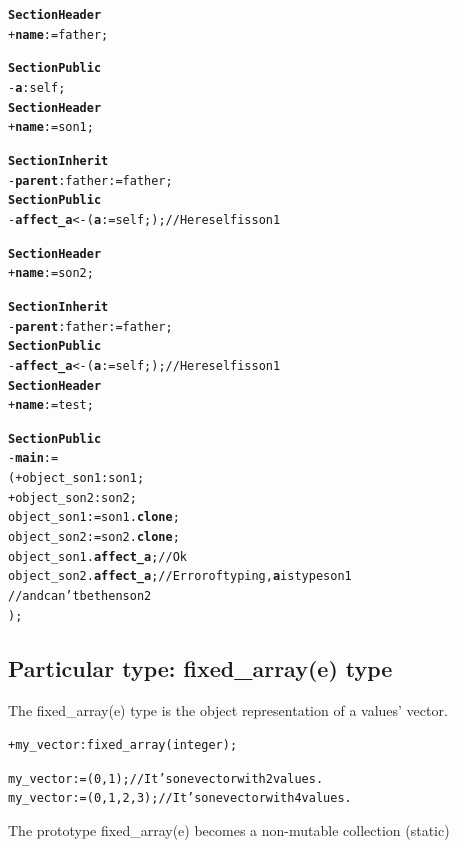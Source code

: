 \documentclass[11pt]{mybook}
\begin{document}
\begin{alltt}
{\bf{}Section Header}
  + {\bf{}name} := {\sc{}father};

{\bf{}Section Public}
  - {\bf{}a}:{\sc{}self};\\

{\bf{}Section Header}
  + {\bf{}name} := {\sc{}son1};

{\bf{}Section Inherit}
  - {\bf{}parent}:{\sc{}father} := {\sc{}father};
{\bf{}Section Public}
  - {\bf{}affect\_a} <- ( {\bf{}a} := {\sc{}self}; );  // Here {\sc{}self} is {\sc{}son1}

{\bf{}Section Header}
  + {\bf{}name} := {\sc{}son2};

{\bf{}Section Inherit}
  - {\bf{}parent}:{\sc{}father} := {\sc{}father};
{\bf{}Section Public}
  - {\bf{}affect\_a} <- ( {\bf{}a} := {\sc{}self}; );  // Here {\sc{}self} is {\sc{}son1}\\

{\bf{}Section Header}
  + {\bf{}name} := {\sc{}test};

{\bf{}Section Public}
  - {\bf{}main} :=
  ( + object_son1:{\sc{}son1};
    + object_son2:{\sc{}son2};
    object_son1 := {\sc{}son1}.{\bf{}clone};
    object_son2 := {\sc{}son2}.{\bf{}clone};
    object_son1.{\bf{}affect\_a};  // Ok
    object_son2.{\bf{}affect\_a};  // Error of typing, {\bf{}a} is type {\sc{}son1}
                                   // and can't be then {\sc{}son2}
  );
\end{alltt}

\subsection{Particular type: {\sc{}fixed\_array(e)} type}
\label{language_reference:type_names:fixed_array}
%
The {\sc{}fixed\_array(e)} type is the object representation of a values' vector.

\begin{alltt}
  + my\_vector:{\sc{}fixed\_array(integer)};

  my\_vector := (0, 1);       // It's one vector with 2 values.
  my\_vector := (0, 1, 2, 3); // It's one vector with 4 values.
\end{alltt}

The prototype {\sc{}fixed\_array(e)} becomes a non-mutable collection (static)

\end{document}
